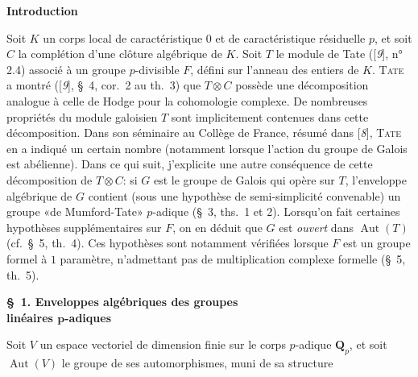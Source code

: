 \begin{center}\textbf{Introduction}\end{center}

Soit $K$ un corps local de caractéristique $0$ et de caractéristique résiduelle $p$, et soit $C$ la complétion d’une clôture algébrique de $K$. Soit $T$ le module de Tate ([\textit{9}], n° 2.4) associé à un groupe $p$-divisible $F$, défini sur l’anneau des entiers de $K$. \textsc{Tate} a montré ([\textit{9}], \S~4, cor.~2 au th.~3) que $T\otimes C$ possède une décomposition analogue à celle de Hodge pour la cohomologie complexe. De nombreuses propriétés du module galoisien $T$ sont implicitement contenues dans cette décomposition. Dans son séminaire au Collège de France, résumé dans [\textit{8}], \textsc{Tate} en a indiqué un certain nombre (notamment lorsque l’action du groupe de Galois est abélienne). Dans ce qui suit, j’explicite une autre conséquence de cette décomposition de $T\otimes C$: si $G$ est le groupe de Galois qui opère sur $T$, l’enveloppe algébrique de $G$ contient (sous une hypothèse de semi-simplicité convenable) un groupe «de Mumford-Tate» $p$-adique (\S~3, ths.~1 et 2). Lorsqu’on fait certaines hypothèses supplémentaires sur $F$, on en déduit que $G$ est \textit{ouvert} dans $\operatorname{Aut}(T)$ (cf.~\S~5, th.~4). Ces hypothèses sont notamment vérifiées lorsque $F$ est un groupe formel à $1$ paramètre, n’admettant pas de multiplication complexe formelle (\S~5, th.~5).

\begin{center}\textbf{\S~1. Enveloppes algébriques des groupes\\ linéaires $\boldsymbol{p}$-adiques}\end{center}

Soit $V$ un espace vectoriel de dimension finie sur le corps $p$-adique $\mathbf{Q}_p$, et soit $\operatorname{Aut}(V)$ le groupe de ses automorphismes, muni de sa structure
